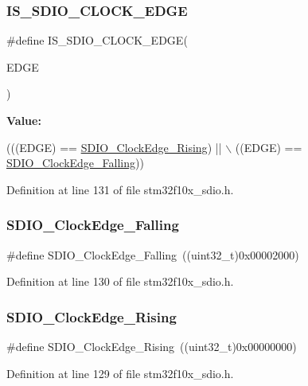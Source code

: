\subsubsection{\texorpdfstring{I\+S\+\_\+\+S\+D\+I\+O\+\_\+\+C\+L\+O\+C\+K\+\_\+\+E\+D\+GE}{IS\_SDIO\_CLOCK\_EDGE}}
{\footnotesize\ttfamily \#define I\+S\+\_\+\+S\+D\+I\+O\+\_\+\+C\+L\+O\+C\+K\+\_\+\+E\+D\+GE(\begin{DoxyParamCaption}\item[{}]{E\+D\+GE }\end{DoxyParamCaption})}

{\bfseries Value\+:}
\begin{DoxyCode}
(((EDGE) == \hyperlink{group___s_d_i_o___clock___edge_ga6d0f902037762a3048d95303c0037313}{SDIO\_ClockEdge\_Rising}) || \(\backslash\)
                                  ((EDGE) == \hyperlink{group___s_d_i_o___clock___edge_ga7be68024e3e2fe1994def85bc944189b}{SDIO\_ClockEdge\_Falling}))
\end{DoxyCode}


Definition at line 131 of file stm32f10x\+\_\+sdio.\+h.

\mbox{\label{group___s_d_i_o___clock___edge_ga7be68024e3e2fe1994def85bc944189b}} 
\subsubsection{\texorpdfstring{S\+D\+I\+O\+\_\+\+Clock\+Edge\+\_\+\+Falling}{SDIO\_ClockEdge\_Falling}}
{\footnotesize\ttfamily \#define S\+D\+I\+O\+\_\+\+Clock\+Edge\+\_\+\+Falling~((uint32\+\_\+t)0x00002000)}



Definition at line 130 of file stm32f10x\+\_\+sdio.\+h.

\mbox{\label{group___s_d_i_o___clock___edge_ga6d0f902037762a3048d95303c0037313}} 
\subsubsection{\texorpdfstring{S\+D\+I\+O\+\_\+\+Clock\+Edge\+\_\+\+Rising}{SDIO\_ClockEdge\_Rising}}
{\footnotesize\ttfamily \#define S\+D\+I\+O\+\_\+\+Clock\+Edge\+\_\+\+Rising~((uint32\+\_\+t)0x00000000)}



Definition at line 129 of file stm32f10x\+\_\+sdio.\+h.

